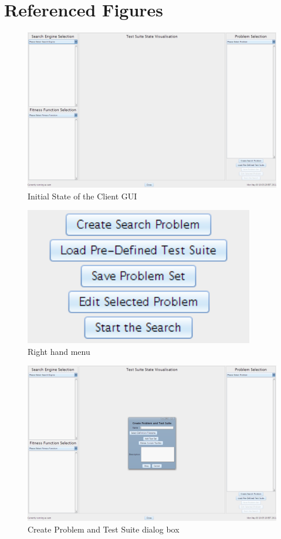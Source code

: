 \section{Referenced Figures}
\begin{figure}[h!]
  \includegraphics[width=\textwidth]{walkthrough1.png}
 \caption{Initial State of the Client GUI}
 \label{fig:walkthrough1}
\end{figure}

\begin{figure}
\begin{center}
  \includegraphics[width=10cm]{walkthrough2.png}
\end{center}
 \caption{Right hand menu}
 \label{fig:walkthrough2}
\end{figure}

\begin{figure}
  \includegraphics[width=\textwidth]{walkthrough3.png}
 \caption{Create Problem and Test Suite dialog box}
 \label{fig:walkthrough3}
\end{figure}

